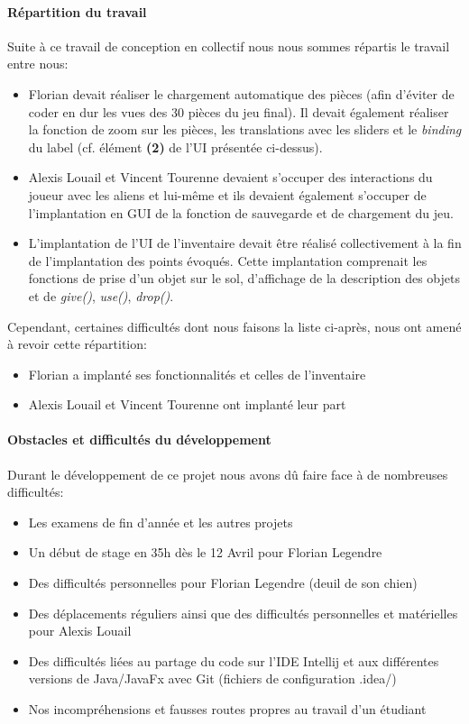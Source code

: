 \documentclass[./standalone.tex]{subfiles}
\begin{document}
\paragraph{Répartition du travail\\}
Suite à ce travail de conception en collectif nous nous sommes répartis le travail entre nous:
\begin{itemize}
	\item Florian devait réaliser le chargement automatique des pièces (afin d'éviter de coder en dur les vues des 30 pièces du jeu final). Il devait également réaliser la fonction de zoom sur les pièces, les translations avec les sliders et le \textit{binding} du label (cf. élément \textbf{(2)} de l'UI présentée ci-dessus).
	\item Alexis Louail et Vincent Tourenne devaient s'occuper des interactions du joueur avec les aliens et lui-même et ils devaient également s'occuper de l'implantation en GUI de la fonction de sauvegarde et de chargement du jeu.
	\item L'implantation de l'UI de l'inventaire devait être réalisé collectivement à la fin de l'implantation des points évoqués. Cette implantation comprenait les fonctions de prise d'un objet sur le sol, d'affichage de la description des objets et de \textit{give()}, \textit{use()}, \textit{drop()}.\\
\end{itemize}

Cependant, certaines difficultés dont nous faisons la liste ci-après, nous ont amené à revoir cette répartition:
\begin{itemize}
	\item Florian a implanté ses fonctionnalités et celles de l'inventaire
	\item Alexis Louail et Vincent Tourenne ont implanté leur part\\
\end{itemize}
 
\paragraph{Obstacles et difficultés du développement\\}

Durant le développement de ce projet nous avons dû faire face à de nombreuses difficultés:
\begin{itemize}
	\item Les examens de fin d'année et les autres projets
	\item Un début de stage en 35h dès le 12 Avril pour Florian Legendre
	\item Des difficultés personnelles pour Florian Legendre (deuil de son chien)
	\item Des déplacements réguliers ainsi que des difficultés personnelles et matérielles pour Alexis Louail
	\item Des difficultés liées au partage du code sur l'IDE Intellij et aux différentes versions de Java/JavaFx avec Git (fichiers de configuration .idea/)
	\item Nos incompréhensions et fausses routes propres au travail d'un étudiant\\
\end{itemize}
\end{document}
